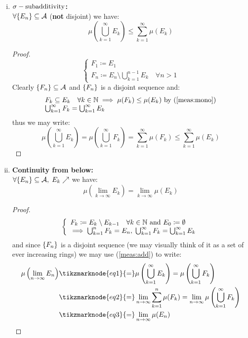 \begin{enumerate}[i)]
    \item \label{meas:sub} \textbf{$\sigma-\text{subadditivity}$:} \\
    $\forall \{ E_n \}\subseteq\mathcal{A}$ (\textbf{not} disjoint) we have:
    \[
        \mu\left( \bigcup_{k=1}^{\infty} E_k \right) \leq \sum_{k=1}^{\infty} \mu(E_k)
    \]
    \begin{proof}
    \provdef{}
    \[
        \left\{ \begin{array}{l}
            F_1 \coloneqq E_1 \\
            F_n \coloneqq E_n \setminus \bigcup_{k=1}^{n-1} E_k \quad \forall n > 1
        \end{array} \right.  
    \]
    Clearly $\{ F_n \} \subseteq \mathcal{A}$ and $\{ F_n \}$ is a disjoint sequence and:
    \[
        \begin{array}{l}
            F_k \subseteq E_k \quad \forall k\in\mathbb{N} \implies \mu(F_k) \leq \mu(E_k) \text{ by (\ref{meas:mono})} \\
            \bigcup_{k=1}^{\infty} F_k = \bigcup_{k=1}^{\infty} E_k    
        \end{array}
    \]
    thus we may write:
    \[
        \mu\left( \bigcup_{k=1}^{\infty} E_k \right) = \mu\left( \bigcup_{k=1}^{\infty} F_k \right) = \sum_{k=1}^{\infty} \mu(F_k) \leq \sum_{k=1}^{\infty} \mu(E_k)   
    \]
    \end{proof}

    \item \label{meas:contbel} \textbf{Continuity from below:} \\
    $\forall \{ E_n \}\subseteq\mathcal{A}, \; E_k \nearrow$ we have:
    \[
        \mu \left( \lim_{k\to\infty}E_k \right)  = \lim_{k\to\infty} \mu(E_k)    
    \]
    \begin{proof}
    \[
        \left\{ \begin{array}{l}
            F_k \coloneqq E_k \setminus E_{k-1} \quad \forall k \in\mathbb{N} \text{ and } E_0 \coloneqq \emptyset \\
            \implies \bigcup_{k=1}^n F_k = E_n ,\; \bigcup_{k=1}^{\infty} F_k = \bigcup_{k=1}^{\infty} E_k
        \end{array} \right.
    \]
    and since $\{ F_n \}$ is a disjoint sequence (we may visually think of it as a set of ever increasing rings) we may use (\ref{meas:add}) to write:
    \begin{align*}
        \mu\left( \lim_{n\to\infty} E_n \right) &\tikzmarknode{eq1}{=} \mu\left( \bigcup_{k=1}^{\infty} E_k \right) = \mu\left( \bigcup_{k=1}^{\infty} F_k \right) \\
        & \tikzmarknode{eq2}{=} \lim_{n\to\infty}\sum_{k=1}^{n} \mu(F_k) = \lim_{n\to\infty} \mu \left( \bigcup_{k=1}^{\infty} F_k \right) \\
        & \tikzmarknode{eq3}{=} \lim_{n\to\infty} \mu(E_n)
    \end{align*} 
    \end{proof}


\end{enumerate}

